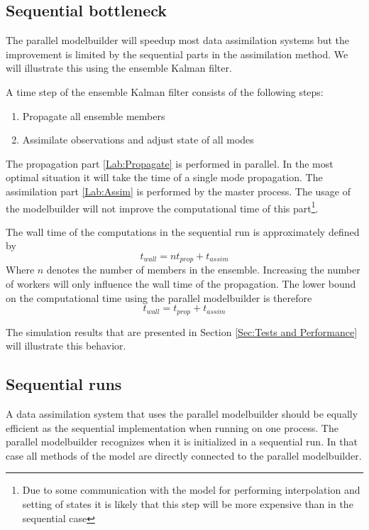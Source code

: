\subsection{Sequential bottleneck}
The parallel modelbuilder will speedup most data assimilation systems but
the improvement is limited by the sequential parts in the assimilation
method. We will illustrate this using the ensemble Kalman filter. 

A time step of the ensemble Kalman filter consists of the following steps:
\begin{enumerate}
\item \label{Lab:Propagate} Propagate all ensemble members
\item \label{Lab:Assim} Assimilate observations and adjust state of all modes
\end{enumerate}

The propagation part \ref{Lab:Propagate} is performed in parallel. In the
most optimal situation it will take the time of a single mode propagation.
The assimilation part \ref{Lab:Assim} is performed by the master process.
The usage of the modelbuilder will not improve the computational time of
this part\footnote{Due to some communication with the model for performing
interpolation and setting of states it is likely that this step will be
more expensive than in the sequential case}.

The wall time of the computations in the sequential run is approximately
defined by
\begin{equation}
t_{wall}=n t_{prop} + t_{assim}
\end{equation}
Where $n$ denotes the number of members in the ensemble. Increasing the
number of workers will only influence the wall time of the propagation. The
lower bound on the computational time using the parallel modelbuilder is
therefore
\begin{equation}
t_{wall}=t_{prop} + t_{assim}
\end{equation}

The simulation results that are presented in Section \ref{Sec:Tests and
Performance} will illustrate this behavior.

\subsection{Sequential runs}
A data assimilation system that uses the parallel modelbuilder should be
equally efficient as the sequential implementation when running on one
process. The parallel modelbuilder recognizes when it is initialized in a
sequential run. In that case all methods of the model are directly
connected to the parallel modelbuilder.

